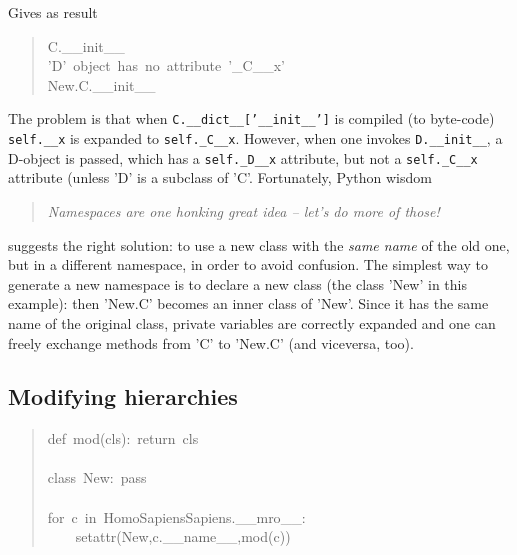 \documentclass[10pt,english]{article}
\begin{document}
Gives as result
\begin{quote}
\begin{ttfamily}\begin{flushleft}
\mbox{C.{\_}{\_}init{\_}{\_}}\\
\mbox{'D'~object~has~no~attribute~'{\_}C{\_}{\_}x'}\\
\mbox{New.C.{\_}{\_}init{\_}{\_}}
\end{flushleft}\end{ttfamily}
\end{quote}

The problem is that when \texttt{C.{\_}{\_}dict{\_}{\_}['{\_}{\_}init{\_}{\_}']} is compiled 
(to byte-code) \texttt{self.{\_}{\_}x} is expanded to \texttt{self.{\_}C{\_}{\_}x}. However,
when one invokes \texttt{D.{\_}{\_}init{\_}{\_}}, a D-object is passed, which has
a \texttt{self.{\_}D{\_}{\_}x} attribute, but not a \texttt{self.{\_}C{\_}{\_}x} attribute (unless
'D' is a subclass of 'C'. Fortunately, Python wisdom
\begin{quote}

\emph{Namespaces are one honking great idea -- let's do more of those!}
\end{quote}

suggests the right solution: to use a new class with the \emph{same name}
of the old one, but in a different namespace, in order to avoid
confusion. The simplest way to generate a new namespace is to
declare a new class (the class 'New' in this example): then 'New.C'
becomes an inner class of 'New'. Since it has the same name of the
original class, private variables are correctly expanded and one
can freely exchange methods from 'C' to 'New.C' (and viceversa, too).



\hypertarget{modifying-hierarchies}{}
\subsection*{Modifying hierarchies}
\begin{quote}
\begin{ttfamily}\begin{flushleft}
\mbox{def~mod(cls):~return~cls}\\
\mbox{}\\
\mbox{class~New:~pass}\\
\mbox{}\\
\mbox{for~c~in~HomoSapiensSapiens.{\_}{\_}mro{\_}{\_}:}\\
\mbox{~~~~setattr(New,c.{\_}{\_}name{\_}{\_},mod(c))}
\end{flushleft}\end{ttfamily}
\end{quote}
\end{document}
